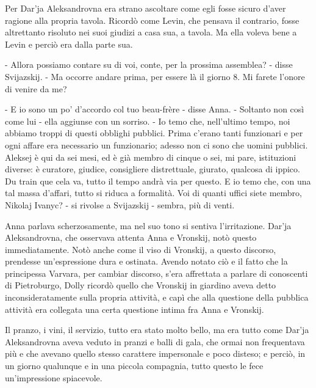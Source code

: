 Per Dar'ja Aleksandrovna era strano ascoltare come egli fosse sicuro d'aver ragione alla propria tavola. Ricordò come Levin, che pensava il contrario, fosse altrettanto risoluto nei suoi giudizi a casa sua, a tavola. Ma ella voleva bene a Levin e perciò era dalla parte sua. 

- Allora possiamo contare su di voi, conte, per la prossima assemblea? - disse Svijazskij. - Ma occorre andare prima, per essere là il giorno 8. Mi farete l'onore di venire da me? 

- E io sono un po' d'accordo col tuo beau-frère - disse Anna. - Soltanto non così come lui - ella aggiunse con un sorriso. - Io temo che, nell'ultimo tempo, noi abbiamo troppi di questi obblighi pubblici. Prima c'erano tanti funzionari e per ogni affare era necessario un funzionario; adesso non ci sono che uomini pubblici. Aleksej è qui da sei mesi, ed è già membro di cinque o sei, mi pare, istituzioni diverse: è curatore, giudice, consigliere distrettuale, giurato, qualcosa di ippico. Du train que cela va, tutto il tempo andrà via per questo. E io temo che, con una tal massa d'affari, tutto si riduca a formalità. Voi di quanti uffici siete membro, Nikolaj Ivanyc? - si rivolse a Svijazskij - sembra, più di venti. 

Anna parlava scherzosamente, ma nel suo tono si sentiva l'irritazione. Dar'ja Aleksandrovna, che osservava attenta Anna e Vronskij, notò questo immediatamente. Notò anche come il viso di Vronskij, a questo discorso, prendesse un'espressione dura e ostinata. Avendo notato ciò e il fatto che la principessa Varvara, per cambiar discorso, s'era affrettata a parlare di conoscenti di Pietroburgo, Dolly ricordò quello che Vronskij in giardino aveva detto inconsideratamente sulla propria attività, e capì che alla questione della pubblica attività era collegata una certa questione intima fra Anna e Vronskij. 

Il pranzo, i vini, il servizio, tutto era stato molto bello, ma era tutto come Dar'ja Aleksandrovna aveva veduto in pranzi e balli di gala, che ormai non frequentava più e che avevano quello stesso carattere impersonale e poco disteso; e perciò, in un giorno qualunque e in una piccola compagnia, tutto questo le fece un'impressione spiacevole. 

